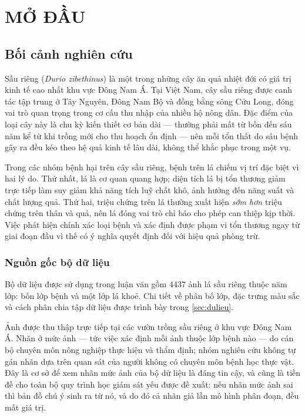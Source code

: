 \chapter{MỞ ĐẦU}
\label{chap:modau}

\section{Bối cảnh nghiên cứu}
\label{sec:boicanh}

Sầu riêng (\textit{Durio zibethinus}) là một trong những cây ăn quả nhiệt đới có
giá trị kinh tế cao nhất khu vực Đông Nam Á. Tại Việt Nam, cây sầu riêng được
canh tác tập trung ở Tây Nguyên, Đông Nam Bộ và đồng bằng sông Cửu Long, đóng vai
trò quan trọng trong cơ cấu thu nhập của nhiều hộ nông dân. Đặc điểm của loại cây
này là chu kỳ kiến thiết cơ bản dài --- thường phải mất từ bốn đến sáu năm kể từ
khi trồng mới cho thu hoạch ổn định --- nên mỗi tổn thất do sâu bệnh gây ra đều
kéo theo hệ quả kinh tế lâu dài, không thể khắc phục trong một vụ.

Trong các nhóm bệnh hại trên cây sầu riêng, bệnh trên lá chiếm vị trí đặc biệt vì
hai lý do. Thứ nhất, lá là cơ quan quang hợp; diện tích lá bị tổn thương giảm
trực tiếp làm suy giảm khả năng tích luỹ chất khô, ảnh hưởng đến năng suất và
chất lượng quả. Thứ hai, triệu chứng trên lá thường xuất hiện \emph{sớm hơn}
triệu chứng trên thân và quả, nên lá đóng vai trò chỉ báo cho phép can thiệp kịp
thời. Việc phát hiện chính xác loại bệnh và xác định được phạm vi tổn thương ngay
từ giai đoạn đầu vì thế có ý nghĩa quyết định đối với hiệu quả phòng trừ.

\subsection{Nguồn gốc bộ dữ liệu}
\label{subsec:nguongoc}

Bộ dữ liệu được sử dụng trong luận văn gồm \num{4437} ảnh lá sầu riêng thuộc năm
lớp: bốn lớp bệnh và một lớp lá khoẻ. Chi tiết về phân bố lớp, đặc trưng màu sắc
và cách phân chia tập dữ liệu được trình bày trong \cref{sec:dulieu}.

Ảnh được thu thập trực tiếp tại các vườn trồng sầu riêng ở khu vực Đông Nam Á.
Nhãn ở mức ảnh --- tức việc xác định mỗi ảnh thuộc lớp bệnh nào --- do cán bộ
chuyên môn nông nghiệp thực hiện và thẩm định; nhóm nghiên cứu không tự gán nhãn
dựa trên quan sát của người không có chuyên môn bệnh học thực vật. Đây là cơ sở
để xem nhãn mức ảnh của bộ dữ liệu là đáng tin cậy, và cũng là tiền đề cho toàn
bộ quy trình học giám sát yếu được đề xuất: nếu nhãn mức ảnh sai thì bản đồ chú ý
sinh ra từ nó, và do đó cả nhãn giả lẫn mô hình phân đoạn, đều mất giá trị.

